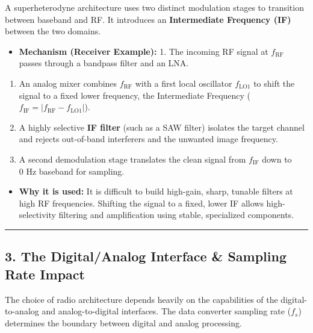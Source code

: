 \documentclass[
]{article}
\providecommand{\tightlist}{%
  \setlength{\itemsep}{0pt}\setlength{\parskip}{0pt}}
\begin{document}
A superheterodyne architecture uses two distinct modulation stages to
transition between baseband and RF. It introduces an
\textbf{Intermediate Frequency (IF)} between the two domains.

\begin{itemize}
\tightlist
\item
  \textbf{Mechanism (Receiver Example):} 1. The incoming RF signal at
  \(f_{\text{RF}}\) passes through a bandpass filter and an LNA.
\end{itemize}

\begin{enumerate}
\def\labelenumi{\arabic{enumi}.}
\setcounter{enumi}{1}
\tightlist
\item
  An analog mixer combines \(f_{\text{RF}}\) with a first local
  oscillator \(f_{\text{LO1}}\) to shift the signal to a fixed lower
  frequency, the Intermediate Frequency
  (\(f_{\text{IF}} = |f_{\text{RF}} - f_{\text{LO1}}|\)).
\item
  A highly selective \textbf{IF filter} (such as a SAW filter) isolates
  the target channel and rejects out-of-band interferers and the
  unwanted image frequency.
\item
  A second demodulation stage translates the clean signal from
  \(f_{\text{IF}}\) down to \(0\text{ Hz}\) baseband for sampling.
\end{enumerate}

\begin{itemize}
\tightlist
\item
  \textbf{Why it is used:} It is difficult to build high-gain, sharp,
  tunable filters at high RF frequencies. Shifting the signal to a
  fixed, lower IF allows high-selectivity filtering and amplification
  using stable, specialized components.
\end{itemize}

\begin{center}\rule{0.5\linewidth}{0.5pt}\end{center}

\subsection{3. The Digital/Analog Interface \& Sampling Rate
Impact}\label{the-digitalanalog-interface-sampling-rate-impact}

The choice of radio architecture depends heavily on the capabilities of
the digital-to-analog and analog-to-digital interfaces. The data
converter sampling rate (\(f_s\)) determines the boundary between
digital and analog processing.
\end{document}
